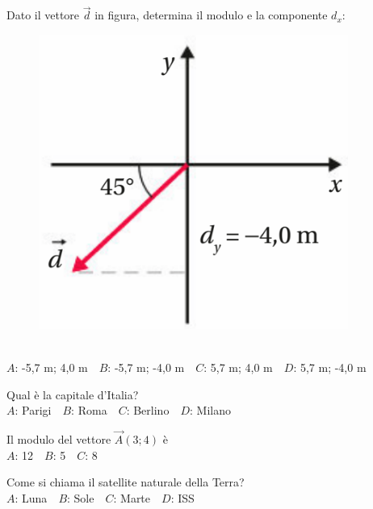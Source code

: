 \mcquestionheader Dato il vettore $\vec{d}$ in figura, determina il modulo e la componente $d_x$: \begin{figure}[h!]   \begin{center}     \includegraphics[scale=0.35]{vettored.png}   \end{center} \end{figure}\\
{$A$}: -5,7 m; 4,0 m\ \ {$B$}: -5,7 m; -4,0 m\ \ {$C$}: 5,7 m; 4,0 m\ \ {$D$}: 5,7 m; -4,0 m\ \ 

\mcquestionfooter



\def\mcquestionnumber{4}


\mcquestionheader Qual è la capitale d’Italia?\\
{$A$}: Parigi\ \ {$B$}: Roma\ \ {$C$}: Berlino\ \ {$D$}: Milano\ \ 

\mcquestionfooter



\def\mcquestionnumber{5}


\mcquestionheader Il modulo del vettore $\vec{A}(3;4)$ è\\
{$A$}: 12\ \ {$B$}: 5\ \ {$C$}: 8\ \ 

\mcquestionfooter



\def\mcquestionnumber{6}


\mcquestionheader Come si chiama il satellite naturale della Terra?\\
{$A$}: Luna\ \ {$B$}: Sole\ \ {$C$}: Marte\ \ {$D$}: ISS\ \ 

\mcquestionfooter



